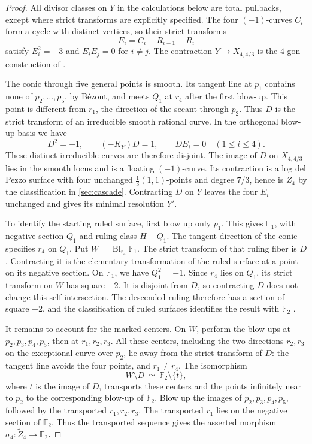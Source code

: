 \documentclass[11pt]{article}
\theoremstyle{plain}
\theoremstyle{definition}
\theoremstyle{remark}
\newcommand{\F}{\mathbb F}
\newcommand{\Bl}{\operatorname{Bl}}
\begin{document}
\begin{proof}
All divisor classes on \(Y\) in the calculations below are total
pullbacks, except where strict transforms are explicitly specified.
The four \((-1)\)-curves \(C_i\) form a cycle with distinct vertices,
so their strict transforms
\[
E_i=C_i-R_{i-1}-R_i
\]
satisfy \(E_i^2=-3\) and \(E_iE_j=0\) for \(i\ne j\).
The contraction \(Y\to X_{4,4/3}\) is the \(4\)-gon construction
of \cite[Section~3.5]{Corti2016}.

The conic through five general points is smooth. Its tangent line at
\(p_1\) contains none of \(p_2,\ldots,p_5\), by B\'ezout, and
meets \(Q_1\) at \(r_4\) after the first blow-up. This point is
different from \(r_1\), the direction of the secant through \(p_2\).
Thus \(D\) is the strict transform of an irreducible smooth
rational curve. In the orthogonal
blow-up basis we have
\[
D^2=-1,\qquad (-K_Y)D=1,\qquad DE_i=0\quad(1\leq i\leq4).
\]
These distinct irreducible curves are therefore disjoint. The image of
\(D\) on \(X_{4,4/3}\) lies in the smooth locus and is a floating
\((-1)\)-curve. Its contraction is a log del Pezzo surface with four
unchanged \(\frac13(1,1)\)-points and degree \(7/3\), hence is
\(Z_4\) by the classification in \cref{sec:cascade}. Contracting
\(D\) on \(Y\) leaves the four \(E_i\) unchanged and gives its
minimal resolution \(Y'\).

To identify the starting ruled surface, first blow up only \(p_1\).
This gives \(\F_1\), with negative section \(Q_1\) and ruling
class \(H-Q_1\). The tangent direction of the conic specifies
\(r_4\) on \(Q_1\). Put
\(W=\Bl_{r_4}\F_1\). The strict transform of that ruling fiber
is \(D\). Contracting it is the elementary transformation of the
ruled surface at a point on its negative section. On \(\F_1\), we have
\(Q_1^2=-1\). Since \(r_4\) lies on \(Q_1\), its strict transform on
\(W\) has square \(-2\). It is disjoint from \(D\), so contracting \(D\)
does not change this self-intersection. The descended ruling therefore has
a section of square \(-2\), and the classification of ruled surfaces
identifies the result with \(\F_2\)
\cite[Chapter~V, Section~2]{Hartshorne1977}.

It remains to account for the marked centers. On \(W\), perform the blow-ups at \(p_2,p_3,p_4,p_5\),
then at \(r_1,r_2,r_3\). All these centers, including the two
directions \(r_2,r_3\) on the exceptional curve over \(p_2\),
lie away from the strict transform of \(D\): the tangent line
avoids the four points, and \(r_1\ne r_4\). The isomorphism
\[
W\setminus D\ \simeq\ \F_2\setminus\{t\},
\]
where \(t\) is the image of \(D\), transports these centers and
the points infinitely near to \(p_2\) to the corresponding blow-up of
\(\F_2\). Blow up the images of \(p_2,p_3,p_4,p_5\), followed by the
transported \(r_1,r_2,r_3\). The transported \(r_1\) lies on the negative
section of \(\F_2\). Thus the transported sequence gives the asserted
morphism \(\sigma_4:\widetilde Z_4\to\F_2\).
\end{proof}
\end{document}
